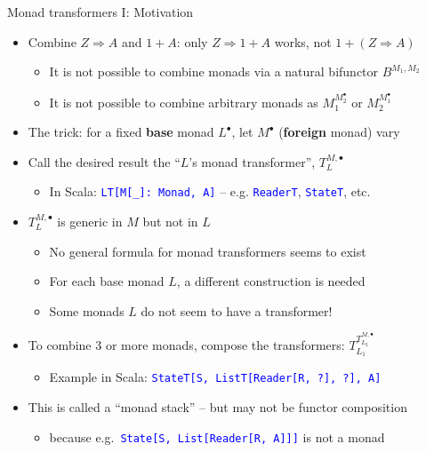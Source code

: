 \documentclass[english]{beamer}
\begin{document}
\begin{frame}{Monad transformers I: Motivation}

\begin{itemize}
\item {\footnotesize{}\vspace{-0.2cm}}Combine $Z\Rightarrow A$ and $1+A$:
only $Z\Rightarrow1+A$ works, not $1+\left(Z\Rightarrow A\right)$
\begin{itemize}
\item It is not possible to combine monads via a natural bifunctor $B^{M_{1},M_{2}}$
\item It is not possible to combine arbitrary monads as $M_{1}^{M_{2}^{\bullet}}$
or $M_{2}^{M_{1}^{\bullet}}$
\end{itemize}
\item The trick: for a fixed \textbf{base }monad $L^{\bullet}$, let $M^{\bullet}$
(\textbf{foreign }monad) vary
\item Call the desired result the ``$L$'s monad transformer'', $T_{L}^{M,\bullet}$
\begin{itemize}
\item In Scala: \texttt{\textcolor{blue}{\footnotesize{}LT{[}M{[}\_{]}:~Monad,
A{]}}} -- e.g. \texttt{\textcolor{blue}{\footnotesize{}ReaderT}},
\texttt{\textcolor{blue}{\footnotesize{}StateT}}, etc.
\end{itemize}
\item $T_{L}^{M,\bullet}$ is generic in $M$ but not in $L$
\begin{itemize}
\item No general formula for monad transformers seems to exist
\item For each base monad $L$, a different construction is needed
\item Some monads $L$ do not seem to have a transformer!
\end{itemize}
\item To combine 3 or more monads, compose the transformers: $T_{L_{1}}^{T_{L_{2}}^{M,\bullet}}$
\begin{itemize}
\item Example in Scala: \texttt{\textcolor{blue}{\footnotesize{}StateT{[}S,
ListT{[}Reader{[}R, ?{]}, ?{]}, A{]}}} 
\end{itemize}
\item This is called a ``monad stack'' -- but may not be functor composition
\begin{itemize}
\item because e.g.~\texttt{\textcolor{blue}{\footnotesize{}State{[}S, List{[}Reader{[}R,
A{]}{]}{]}}} is not a monad
\end{itemize}
\end{itemize}
\end{frame}
\end{document}
